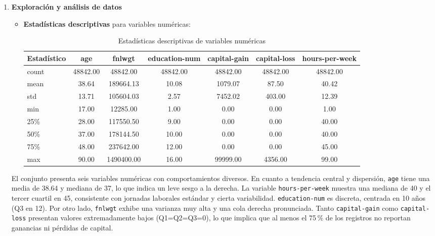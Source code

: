 \documentclass[12pt,a4paper]{article}
\begin{document}
\begin{enumerate}
   \item \textbf{Exploración y análisis de datos}
    \begin{itemize}
      \item \textbf{Estadísticas descriptivas} para variables numéricas:
      \begin{table}[H]
        \centering
        \small
        \begin{tabular}{@{}l S[table-format=2.2] S[table-format=6.2] S[table-format=2.2] S[table-format=5.2] S[table-format=4.2] S[table-format=2.2]@{}}
          \toprule
          \textbf{Estadístico} & \textbf{age} & \textbf{fnlwgt} & \textbf{education-num} & \textbf{capital-gain} & \textbf{capital-loss} & \textbf{hours-per-week} \\
          \midrule
          count & 48842.00 & 48842.00 & 48842.00 & 48842.00 & 48842.00 & 48842.00 \\
          mean  & 38.64    & 189664.13 & 10.08    & 1079.07  & 87.50    & 40.42 \\
          std   & 13.71    & 105604.03 & 2.57     & 7452.02  & 403.00   & 12.39 \\
          min   & 17.00    & 12285.00  & 1.00     & 0.00     & 0.00     & 1.00 \\
          25\%  & 28.00    & 117550.50 & 9.00     & 0.00     & 0.00     & 40.00 \\
          50\%  & 37.00    & 178144.50 & 10.00    & 0.00     & 0.00     & 40.00 \\
          75\%  & 48.00    & 237642.00 & 12.00    & 0.00     & 0.00     & 45.00 \\
          max   & 90.00    & 1490400.00& 16.00    & 99999.00 & 4356.00  & 99.00 \\
          \bottomrule
        \end{tabular}
        \caption{Estadísticas descriptivas de variables numéricas}
        \label{tab:adult_stats}
      \end{table}
    \end{itemize}

    El conjunto presenta seis variables numéricas con comportamientos diversos. En cuanto a tendencia central y 
    dispersión, \texttt{age} tiene una media de 38.64 y mediana de 37, lo que indica un leve sesgo a la derecha. 
    La variable \texttt{hours-per-week} muestra una mediana de 40 y el tercer cuartil en 45, consistente con jornadas 
    laborales estándar y cierta variabilidad. \texttt{education-num} es discreta, centrada en 10 años (Q3 en 12). 
    Por otro lado, \texttt{fnlwgt} exhibe una varianza muy alta y una cola derecha pronunciada. Tanto \texttt{capital-gain} 
    como \texttt{capital-loss} presentan valores extremadamente bajos (Q1=Q2=Q3=0), lo que implica que al menos el 75\,\% de 
    los registros no reportan ganancias ni pérdidas de capital.


\end{enumerate}
\end{document}
